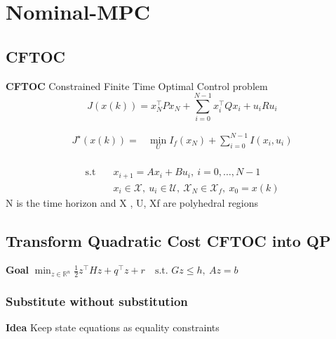 \section{Nominal-MPC}

\subsection{CFTOC}

\begin{sstTitleBox}[ForestGreen]{\textbf{\large
			CFTOC
		}
		Constrained Finite Time Optimal Control problem
	}
	\[
		J(x(k)) = x_N^\top P x_N + \sum_{i=0}^{N-1}x_i^\top Q x_i + u_i R u_i
	\]
	\begin{centering}
		\begin{sstFrame}[ForestGreen]
			\vspace{-1.5mm}
			\color{white}
			\[ \begin{aligned}
					J^\star (x(k)) = & \min_{U}  I_f(x_N) + \sum_{i=0}^{N-1} I(x_{i}, u_{i}) \\
				\end{aligned} \]
			\vspace{-2.5mm}
		\end{sstFrame}
		\[ \begin{aligned}
				\text{s.t} \quad & x_{i+1} = A x_{i} + Bu_{i},\ i = 0,\dots,N-1                                                  \\
				                 & x_{i} \in \mathcal{X},\ u_{i} \in \mathcal{U},\ \mathcal{X}_N \in \mathcal{X}_f, \ x_0 = x(k)
			\end{aligned} \]
		N is the time horizon and X , U, Xf are polyhedral regions
	\end{centering}
\end{sstTitleBox}

\subsection{Transform Quadratic Cost CFTOC into QP}

\textbf{Goal}
$\min_{z\in\mathbb{R}^n}
	\textstyle\frac{1}{2}z^\top H z + q^\top z + r
	\quad\text{s.t. }Gz\leq h,\ Az = b$


\subsubsection{Substitute without substitution}

\textbf{Idea} Keep state equations as equality constraints

